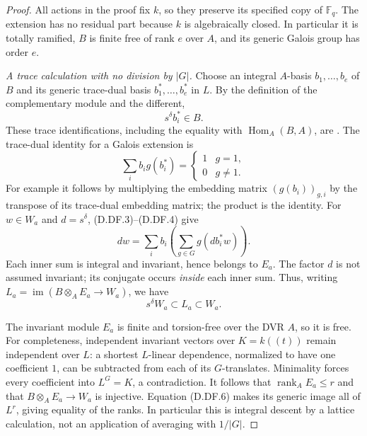 \begin{proof}
All actions in the proof fix $k$, so they preserve its specified
copy of $\mathbb F_q$. The extension has no residual part because
$k$ is algebraically closed. In particular it is totally ramified,
$B$ is finite free of rank $e$ over $A$, and its generic Galois
group has order $e$.

\emph{A trace calculation with no division by $|G|$.}
Choose an integral $A$-basis $b_1,\ldots,b_e$ of $B$ and its
generic trace-dual basis $b_1^*,\ldots,b_e^*$ in $L$.
By the definition of the complementary module and the different,
\[
                 s^\delta b_i^*\in B.                 \tag{D.DF.3}
\]
These trace identifications, including the equality with
$\operatorname{Hom}_A(B,A)$, are
\citep[Section~49.8, especially Lemmas~49.8.2--3 and their
complete proofs, Tag~0BW0]{StacksDifferentLatticeB}.
The trace-dual identity for a Galois extension is
\[
                 \sum_i b_i g(b_i^*)=
                   \begin{cases}1&g=1,\\0&g\ne1.\end{cases}
                                                               \tag{D.DF.4}
\]
For example it follows by multiplying the embedding matrix
$(g(b_i))_{g,i}$ by the transpose of its trace-dual embedding
matrix; the product is the identity.
For $w\in W_a$ and $d=s^\delta$, (D.DF.3)--(D.DF.4) give
\[
 d w=\sum_i b_i\left(\sum_{g\in G}g(d b_i^*w)\right).
                                                               \tag{D.DF.5}
\]
Each inner sum is integral and invariant, hence belongs to $E_a$.
The factor $d$ is not assumed invariant; its conjugate occurs
\emph{inside} each inner sum. Thus, writing
$L_a=\operatorname{im}(B\otimes_AE_a\to W_a)$, we have
\[
                    s^\delta W_a\subset L_a\subset W_a.
                                                               \tag{D.DF.6}
\]

The invariant module $E_a$ is finite and torsion-free over the
DVR $A$, so it is free. For completeness, independent invariant
vectors over $K=k((t))$ remain independent over $L$: a shortest
$L$-linear dependence, normalized to have one coefficient $1$,
can be subtracted from each of its $G$-translates. Minimality
forces every coefficient into $L^G=K$, a contradiction.
It follows that $\operatorname{rank}_AE_a\le r$ and that
$B\otimes_AE_a\to W_a$ is injective. Equation (D.DF.6) makes
its generic image all of $L^r$, giving equality of the ranks.
In particular this is integral descent by a lattice calculation,
not an application of averaging with $1/|G|$.


\end{proof}
